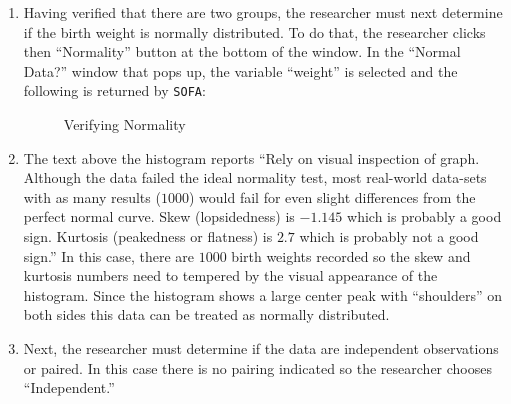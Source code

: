 \begin{enumerate}
  \item Having verified that there are two groups, the researcher must next determine if the birth weight is normally distributed. To do that, the researcher clicks then ``Normality'' button at the bottom of the window. In the ``Normal Data?'' window that pops up, the variable ``weight'' is selected and the following is returned by \texttt{SOFA}:

  \begin{figure}[H]
    \begin{center}
      \caption{Verifying Normality}
    \end{center}
  \end{figure}

  \item The text above the histogram reports ``Rely on visual inspection of graph. Although the data failed the ideal normality test, most real-world data-sets with as many results ($ 1000 $) would fail for even slight differences from the perfect normal curve. Skew (lopsidedness) is $ -1.145 $ which is probably a good sign. Kurtosis (peakedness or flatness) is $ 2.7 $ which is probably not a good sign.'' In this case, there are $ 1000 $ birth weights recorded so the skew and kurtosis numbers need to tempered by the visual appearance of the histogram. Since the histogram shows a large center peak with ``shoulders'' on both sides this data can be treated as normally distributed.
  \item Next, the researcher must determine if the data are independent observations or paired. In this case there is no pairing indicated so the researcher chooses ``Independent.''
  

\end{enumerate}
